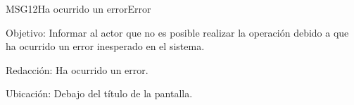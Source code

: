 \begin{mensaje}{MSG12}{Ha ocurrido un error}{Error}
	\item [Objetivo:] Informar al actor que no es posible realizar la operación debido a que ha ocurrido un error inesperado en el sistema.
	\item[Redacción:] Ha ocurrido un error.
	\item [Ubicación:] Debajo del título de la pantalla.
\end{mensaje}